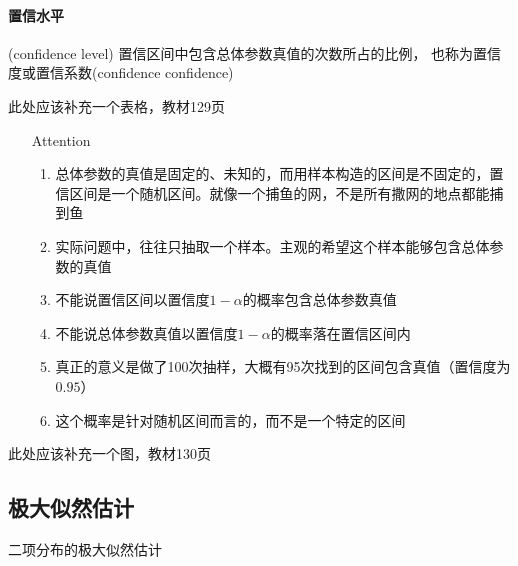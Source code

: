 \documentclass[UTF8,10pt]{book}
\begin{document}
            \paragraph{置信水平} (confidence level) 置信区间中包含总体参数真值的次数所占的比例，
            也称为置信度或置信系数(confidence confidence)

            此处应该补充一个表格，教材129页
            
            {\kaishu

                 \begin{itemize}
                    \item [Attention] {
                        \begin{enumerate}
                            \item 总体参数的真值是固定的、未知的，而用样本构造的区间是不固定的，置信区间是一个随机区间。就像一个捕鱼的网，不是所有撒网的地点都能捕到鱼
                            \item 实际问题中，往往只抽取一个样本。主观的希望这个样本能够包含总体参数的真值
                            \item 不能说置信区间以置信度$1-\alpha$的概率包含总体参数真值
                            \item 不能说总体参数真值以置信度$1-\alpha$的概率落在置信区间内
                            \item 真正的意义是做了100次抽样，大概有95次找到的区间包含真值（置信度为$0.95$）
                            \item 这个概率是针对随机区间而言的，而不是一个特定的区间
                        \end{enumerate}
                    }
                \end{itemize}
			}
            此处应该补充一个图，教材130页

        \subsection{极大似然估计}

                二项分布的极大似然估计
\end{document}
